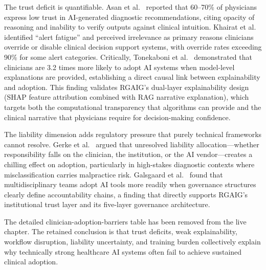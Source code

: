 The trust deficit is quantifiable. Asan et al.~\cite{asan2020artificial} reported that 60--70\% of physicians express low trust in AI-generated diagnostic recommendations, citing opacity of reasoning and inability to verify outputs against clinical intuition. Khairat et al.~\cite{khairat2018physician} identified ``alert fatigue'' and perceived irrelevance as primary reasons clinicians override or disable clinical decision support systems, with override rates exceeding 90\% for some alert categories. Critically, Tonekaboni et al.~\cite{tonekaboni2019clinicians} demonstrated that clinicians are 3.2 times more likely to adopt AI systems when model-level explanations are provided, establishing a direct causal link between explainability and adoption. This finding validates RGAIG's dual-layer explainability design (SHAP feature attribution combined with RAG narrative explanation), which targets both the computational transparency that algorithms can provide and the clinical narrative that physicians require for decision-making confidence.

The liability dimension adds regulatory pressure that purely technical frameworks cannot resolve. Gerke et al.~\cite{gerke2020ethical} argued that unresolved liability allocation---whether responsibility falls on the clinician, the institution, or the AI vendor---creates a chilling effect on adoption, particularly in high-stakes diagnostic contexts where misclassification carries malpractice risk. Galsgaard et al.~\cite{galsgaard2022artificial} found that multidisciplinary teams adopt AI tools more readily when governance structures clearly define accountability chains, a finding that directly supports RGAIG's institutional trust layer and its five-layer governance architecture.
\fi

The detailed clinician-adoption-barriers table has been removed from the live chapter. The retained conclusion is that trust deficits, weak explainability, workflow disruption, liability uncertainty, and training burden collectively explain why technically strong healthcare AI systems often fail to achieve sustained clinical adoption.

